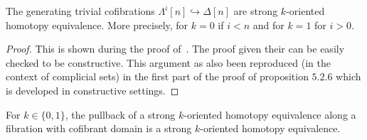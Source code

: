 \documentclass[reqno,10pt,a4paper,oneside,draft]{amsart}
\begin{document}
\begin{lemma}\label{lemma:genTcof_strongHequiv}
The generating trivial cofibrations $\Lambda^i[n] \hookrightarrow \Delta[n]$ are strong $k$-oriented homotopy equivalence.
More precisely, for $k=0$ if $i<n$ and for $k=1$ for $i>0$. 
\end{lemma}

\begin{proof}
This is shown during the proof of~\cite[Theorem 3.2.3]{joyal-tierney:simplicial-homotopy-theory}. The proof given their can be easily checked to be constructive. This argument as also been reproduced (in the context of complicial sets) in the first part of the proof of proposition $5.2.6$ \cite{henry2018wms} which is developed in constructive settings.


\end{proof}


\begin{lemma} 
\label{lemma:pb_of_StrongHomotopyEq}
For $k \in \{0,1\}$, the pullback of a strong $k$-oriented homotopy equivalence
 along a fibration with cofibrant domain is a strong $k$-oriented homotopy equivalence.
\end{lemma}
\end{document}
